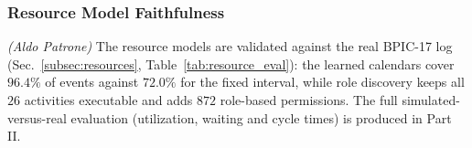 \subsubsection{Resource Model Faithfulness}\label{ssub:res-eval}
\textit{(Aldo Patrone)}\quad
The resource models are validated against the real BPIC-17 log
(Sec.~\ref{subsec:resources}, Table~\ref{tab:resource_eval}): the learned calendars
cover $96.4\%$ of events against $72.0\%$ for the fixed interval, while role discovery
keeps all $26$ activities executable and adds $872$ role-based permissions. The full
simulated-versus-real evaluation (utilization, waiting and cycle times) is produced in Part II.
